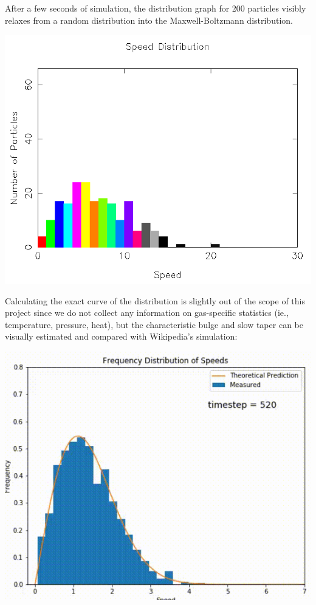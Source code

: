 \documentclass{article}
\begin{document}
After a few seconds of simulation, the distribution graph for 200 particles visibly relaxes from a random distribution
into the Maxwell-Boltzmann distribution.
\\
\begin{center}
    \includegraphics[scale=0.5]{uncharged_random_dist}
\end{center}

Calculating the exact curve of the distribution is slightly out of the scope of this project
since we do not collect any information on gas-specific statistics (ie., temperature, pressure, heat),
but the characteristic bulge and slow taper can be visually estimated and compared with Wikipedia's simulation:
\\
\begin{center}
    \includegraphics[scale=0.5]{mb_wiki}
\end{center}
\end{document}
